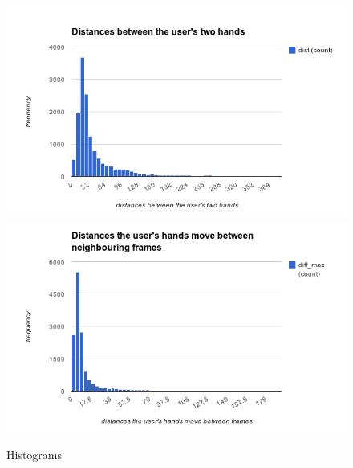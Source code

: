 %
\begin{figure}[htb]
\centering
\includegraphics[width=0.9\linewidth]{fig/histogram1.png}
\includegraphics[width=0.9\linewidth]{fig/histogram2.png}
\caption{Histograms}
\label{fig:histogram}
\end{figure}


